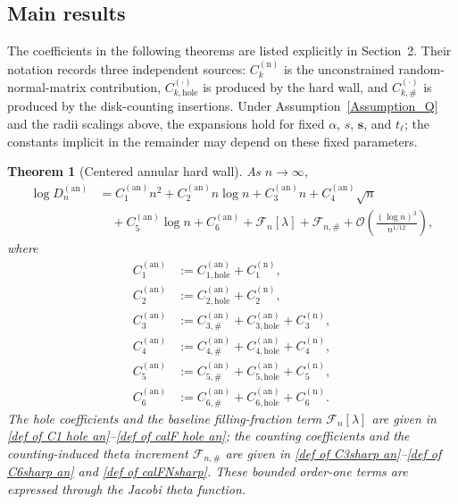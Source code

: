 \documentclass[a4paper]{article}
\newtheorem{theorem}{Theorem}[section]
\numberwithin{equation}{section}
\begin{document}
\subsection{Main results}

The coefficients in the following theorems are listed explicitly in
Section~2.  Their notation records three independent sources:
$C_k^{(\mathrm n)}$ is the unconstrained random-normal-matrix contribution,
$C_{k,\mathrm{hole}}^{(\cdot)}$ is produced by the hard wall, and
$C_{k,\#}^{(\cdot)}$ is produced by the disk-counting insertions.  Under
Assumption~\ref{Assumption_Q} and the radii scalings above, the expansions
hold for fixed $\alpha$, $s$, $\boldsymbol s$, and $t_\ell$; the constants
implicit in the remainder may depend on these fixed parameters.

\begin{theorem}[Centered annular hard wall]
\label{theorem:asymptotic determinant of annulus}
As $n\to\infty$,
\begin{align}
\log D_n^{(\mathrm{an})}
&=C_1^{(\mathrm{an})}n^2
+C_2^{(\mathrm{an})}n\log n
+C_3^{(\mathrm{an})}n
+C_4^{(\mathrm{an})}\sqrt n
\nonumber\\
&\quad
+C_5^{(\mathrm{an})}\log n
+C_6^{(\mathrm{an})}
+\mathcal F_n[\lambda]
+\mathcal F_{n,\#}
+\mathcal O\!\left(\frac{(\log n)^3}{n^{1/12}}\right),
\end{align}
where
\begin{align}
\label{def of C1 Dn an}
C_1^{(\mathrm{an})}
&:=C_{1,\mathrm{hole}}^{(\mathrm{an})}+C_1^{(\mathrm n)},
\\
\label{def of C2 Dn an}
C_2^{(\mathrm{an})}
&:=C_{2,\mathrm{hole}}^{(\mathrm{an})}+C_2^{(\mathrm n)},
\\
\label{def of C3 Dn an}
C_3^{(\mathrm{an})}
&:=C_{3,\#}^{(\mathrm{an})}+C_{3,\mathrm{hole}}^{(\mathrm{an})}+C_3^{(\mathrm n)},
\\
\label{def of C4 Dn an}
C_4^{(\mathrm{an})}
&:=C_{4,\#}^{(\mathrm{an})}+C_{4,\mathrm{hole}}^{(\mathrm{an})}+C_4^{(\mathrm n)},
\\
\label{def of C5 Dn an}
C_5^{(\mathrm{an})}
&:=C_{5,\#}^{(\mathrm{an})}+C_{5,\mathrm{hole}}^{(\mathrm{an})}+C_5^{(\mathrm n)},
\\
\label{def of C6 Dn an}
C_6^{(\mathrm{an})}
&:=C_{6,\#}^{(\mathrm{an})}+C_{6,\mathrm{hole}}^{(\mathrm{an})}+C_6^{(\mathrm n)}.
\end{align}
The hole coefficients and the baseline filling-fraction term
$\mathcal F_n[\lambda]$ are given in
\eqref{def of C1 hole an}--\eqref{def of calF hole an}; the counting
coefficients and the counting-induced theta increment $\mathcal F_{n,\#}$
are given in \eqref{def of C3sharp an}--\eqref{def of C6sharp an} and
\eqref{def of calFNsharp}.  These bounded order-one terms are expressed
through the Jacobi theta function.
\end{theorem}
\end{document}
